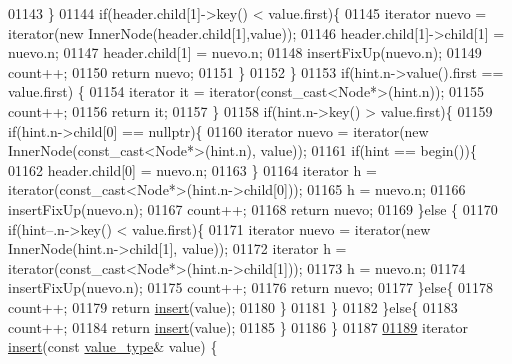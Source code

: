 \begin{DoxyCode}
01143             \}
01144             \textcolor{keywordflow}{if}(header.child[1]->key() < value.first)\{
01145                 iterator nuevo = iterator(\textcolor{keyword}{new} InnerNode(header.child[1],value));
01146                 header.child[1]->child[1] = nuevo.n;
01147                 header.child[1] = nuevo.n;
01148                 insertFixUp(nuevo.n);
01149                 count++;
01150                 \textcolor{keywordflow}{return} nuevo;
01151             \}
01152         \}
01153         \textcolor{keywordflow}{if}(hint.n->value().first == value.first) \{
01154             iterator it = iterator(const\_cast<Node*>(hint.n));
01155             count++;
01156             \textcolor{keywordflow}{return} it;
01157         \}
01158         \textcolor{keywordflow}{if}(hint.n->key() > value.first)\{
01159             \textcolor{keywordflow}{if}(hint.n->child[0] == \textcolor{keyword}{nullptr})\{
01160                 iterator nuevo = iterator(\textcolor{keyword}{new} InnerNode(const\_cast<Node*>(hint.n), value));
01161                 \textcolor{keywordflow}{if}(hint == begin())\{
01162                     header.child[0] = nuevo.n;
01163                 \}
01164                 iterator h = iterator(const\_cast<Node*>(hint.n->child[0]));
01165                 h = nuevo.n;
01166                 insertFixUp(nuevo.n);
01167                 count++;
01168                 \textcolor{keywordflow}{return} nuevo;
01169             \}\textcolor{keywordflow}{else} \{
01170                 \textcolor{keywordflow}{if}(hint--.n->key() < value.first)\{
01171                     iterator nuevo = iterator(\textcolor{keyword}{new} InnerNode(hint.n->child[1], value));
01172                     iterator h = iterator(const\_cast<Node*>(hint.n->child[1]));
01173                     h = nuevo.n;
01174                     insertFixUp(nuevo.n);
01175                     count++;
01176                     \textcolor{keywordflow}{return} nuevo;
01177                 \}\textcolor{keywordflow}{else}\{
01178                     count++;
01179                     \textcolor{keywordflow}{return} \hyperlink{classaed2_1_1map_a6941cde9a79c27f054b5c97a587a1854_a6941cde9a79c27f054b5c97a587a1854}{insert}(value);
01180                 \}
01181             \}
01182         \}\textcolor{keywordflow}{else}\{
01183             count++;
01184             \textcolor{keywordflow}{return} \hyperlink{classaed2_1_1map_a6941cde9a79c27f054b5c97a587a1854_a6941cde9a79c27f054b5c97a587a1854}{insert}(value);
01185         \}
01186     \}
01187 
\hypertarget{map0_8h_source.tex_l01189}{}\hyperlink{classaed2_1_1map_a60aacba06b1579630b3c8e996cf248c8_a60aacba06b1579630b3c8e996cf248c8}{01189}     iterator \hyperlink{classaed2_1_1map_a60aacba06b1579630b3c8e996cf248c8_a60aacba06b1579630b3c8e996cf248c8}{insert}(\textcolor{keyword}{const} \hyperlink{classaed2_1_1map_a719db98e0ff9a837610f76be33264680_a719db98e0ff9a837610f76be33264680}{value\_type}& value) \{

\end{DoxyCode}

